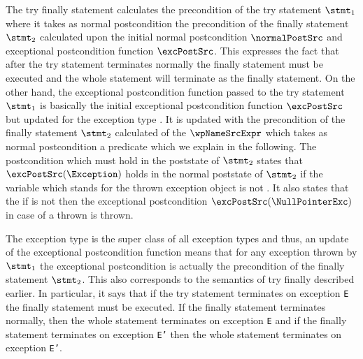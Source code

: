 The  \textsf{try finally} statement  calculates the precondition of the try statement $\stmt_1$ where it takes as normal postcondition
the precondition of the finally statement $\stmt_2$  calculated upon the initial normal postcondition $\normalPostSrc$ and exceptional postcondition function
 $\excPostSrc$. This expresses the fact that after the try statement terminates normally the finally statement must be executed and the whole statement will terminate 
as the finally statement. 
On the other hand, the exceptional postcondition function passed to the try statement $\stmt_1$ is basically the initial exceptional postcondition function $\excPostSrc$ but updated for the exception
type \Exception{}. It is updated 
 with the precondition of the finally statement $\stmt_2$ calculated of the $\wpNameSrcExpr$ which takes as normal postcondition a predicate which we explain in the following.
The postcondition which must hold in the poststate of  $\stmt_2$  states that   $\excPostSrc(\Exception)$ holds in the normal poststate of $\stmt_2$ if the variable
\EXC{} which stands for the thrown exception object is not \Mynull. It also states that the if \EXC{} is not \Mynull{} then the exceptional
postcondition  $\excPostSrc(\NullPointerExc)$ in case of a thrown \NullPointerExc{} is thrown.

 The exception type \Exception{} is the super class of all exception types and thus, 
an update of the exceptional postcondition function 
means that for any exception thrown by $\stmt_1$ the exceptional postcondition is actually the precondition of the finally statement $\stmt_2$.
 This also 
corresponds to the semantics of \textsf{try finally}  described earlier. In particular, it says that if the try statement terminates on exception \texttt{E}
the finally statement must be executed. If the finally statement terminates normally, then the  whole statement terminates on exception \texttt{E} and if the finally statement
terminates on exception  \texttt{E'} then the  whole statement terminates on exception \texttt{E'}.
